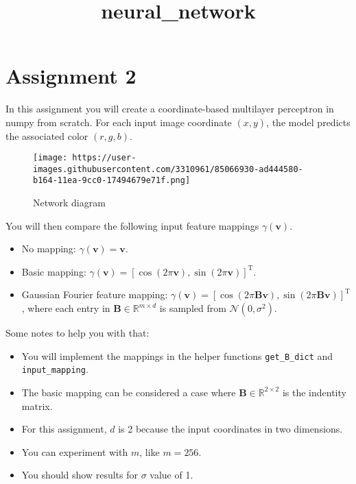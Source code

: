 \documentclass[11pt]{article}
\title{neural\_network}
\providecommand{\tightlist}{%
      \setlength{\itemsep}{0pt}\setlength{\parskip}{0pt}}
\begin{document}
    
    \maketitle
    
    

    
    \hypertarget{assignment-2}{%
\section{Assignment 2}\label{assignment-2}}

In this assignment you will create a coordinate-based multilayer
perceptron in numpy from scratch. For each input image coordinate
\((x,y)\), the model predicts the associated color \((r,g,b)\).

\begin{figure}
\centering
\texttt{[image: https://user-images.githubusercontent.com/3310961/85066930-ad444580-b164-11ea-9cc0-17494679e71f.png]}
\caption{Network diagram}
\end{figure}

You will then compare the following input feature mappings
\(\gamma (\mathbf{v})\).

\begin{itemize}
\item
  No mapping: \(\gamma(\mathbf{v})= \mathbf{v}\).
\item
  Basic mapping:
  \(\gamma(\mathbf{v})=\left[ \cos(2 \pi \mathbf{v}),\sin(2 \pi \mathbf{v}) \right]^\mathrm{T}\).
\item
  Gaussian Fourier feature mapping:
  \(\gamma(\mathbf{v})= \left[ \cos(2 \pi \mathbf B \mathbf{v}), \sin(2 \pi \mathbf B \mathbf{v}) \right]^\mathrm{T}\),
  where each entry in \(\mathbf B \in \mathbb R^{m \times d}\) is
  sampled from \(\mathcal N(0,\sigma^2)\).
\end{itemize}

Some notes to help you with that:

\begin{itemize}
\tightlist
\item
  You will implement the mappings in the helper functions
  \texttt{get\_B\_dict} and \texttt{input\_mapping}.
\item
  The basic mapping can be considered a case where
  \(\mathbf B \in \mathbb R^{2 \times 2}\) is the indentity matrix.
\item
  For this assignment, \(d\) is 2 because the input coordinates in two
  dimensions.
\item
  You can experiment with \(m\), like \(m=256\).
\item
  You should show results for \(\sigma\) value of 1.
\end{itemize}
\end{document}
